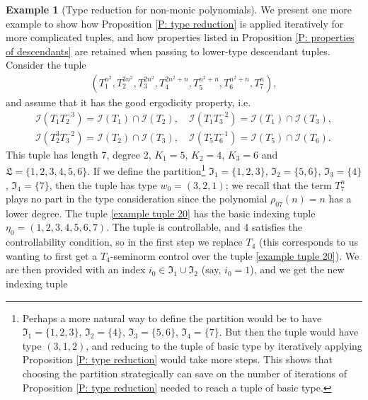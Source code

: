 \documentclass[11pt]{amsart}
\theoremstyle{definition}
\newtheorem{example}{Example}
\newcommand{\CI}{{\mathcal I}}
\newcommand{\FI}{{\mathfrak I}}
\newcommand{\FL}{{\mathfrak L}}
\begin{document}
\begin{example}[Type reduction for non-monic polynomials]\label{Ex:type reduction example}
We present one more example to show how Proposition \ref{P: type reduction} is applied iteratively for more complicated tuples, and how properties listed in Proposition \ref{P: properties of descendants} are retained when passing to lower-type descendant tuples.
Consider the tuple
\begin{align}\label{example tuple 20}
    (T_1^{n^2}, T_2^{3n^2}, T_3^{2n^2}, T_4^{2n^2+n}, T_5^{n^2+n}, T_6^{n^2+n}, T_7^n),
\end{align}
and assume that it has the good ergodicity property, i.e.
\begin{align*}
    \CI(T_1 T_2^{-3}) = \CI(T_1)\cap\CI(T_2),\quad \CI(T_1 T_3^{-2}) = \CI(T_1)\cap\CI(T_3),\\
    \CI(T_2^3 T_3^{-2}) = \CI(T_2)\cap\CI(T_3),\quad \CI(T_5 T_6^{-1}) = \CI(T_5)\cap\CI(T_6).
\end{align*}
This tuple has length 7, degree 2, $K_1 = 5$, $K_2 = 4$, $K_3=6$  and $\FL = \{1, 2, 3, 4, 5, 6\}$. If we define the partition\footnote{Perhaps a more natural way to define the partition would be to have $\FI_1=\{1, 2, 3\}$, $\FI_2 = \{4\}$, $\FI_3 = \{5,6\}$, $\FI_4 = \{7\}$. But then the tuple would have type $(3, 1, 2)$, and reducing to the tuple of basic type by iteratively applying Proposition \ref{P: type reduction} would take more steps. This shows that choosing the partition strategically can save on the number of iterations of Proposition \ref{P: type reduction} needed to reach a tuple of basic type.} $\FI_1=\{1, 2, 3\}$, $\FI_2 = \{5,6\}$, $\FI_3 = \{4\}$, $\FI_4 = \{7\}$, then the tuple has type $w_0 = (3,2, 1)$; we recall that the term $T_7^n$ plays no part in the type consideration since the polynomial $\rho_{07}(n)=n$ has a lower degree. The tuple \eqref{example tuple 20} has the basic indexing tuple $\eta_0 = (1, 2, 3, 4, 5, 6,7)$. The tuple is controllable, and 4 satisfies the controllability condition, so in the first step we replace $T_4$ (this corresponds to us wanting to first get a $T_4$-seminorm control over the tuple \eqref{example tuple 20}). We are then provided with an index $i_0\in\FI_1\cup\FI_2$ (say, $i_0 = 1$), and we get the new indexing tuple

\end{example}
\end{document}
